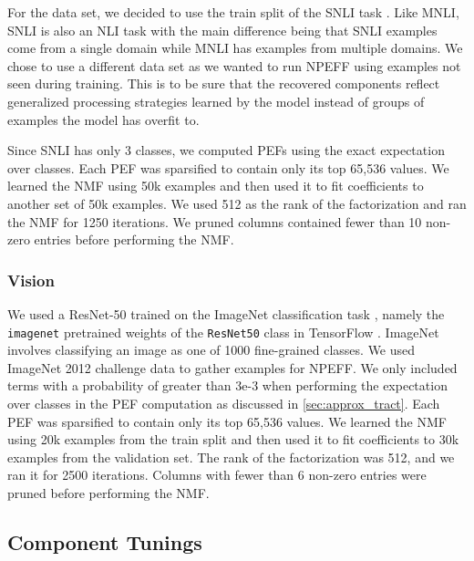 \documentclass[dvipsnames]{article}
\begin{document}
For the data set, we decided to use the train split of the SNLI task \citep{bowman2015large}.
Like MNLI, SNLI is also an NLI task with the main difference being that SNLI examples come from a single domain while MNLI has examples from multiple domains.
We chose to use a different data set as we wanted to run NPEFF using examples not seen during training.
This is to be sure that the recovered components reflect generalized processing strategies learned by the model instead of groups of examples the model has overfit to.

Since SNLI has only 3 classes, we computed PEFs using the exact expectation over classes.
Each PEF was sparsified to contain only its top 65,536 values.
We learned the NMF using 50k examples and then used it to fit coefficients to another set of 50k examples.
We used 512 as the rank of the factorization and ran the NMF for 1250 iterations.
We pruned columns contained fewer than 10 non-zero entries before performing the NMF.

\subsubsection{Vision}
We used a ResNet-50 \citep{he2016deep} trained on the ImageNet classification task \citep{imagenet}, namely the \texttt{imagenet} pretrained weights of the \texttt{ResNet50} class in TensorFlow \citep{abadi2016tensorflow}.
ImageNet involves classifying an image as one of 1000 fine-grained classes.
We used ImageNet 2012 challenge data to gather examples for NPEFF.
We only included terms with a probability of greater than 3e-3 when performing the expectation over classes in the PEF computation as discussed in \cref{sec:approx_tract}.
Each PEF was sparsified to contain only its top 65,536 values.
We learned the NMF using 20k examples from the train split and then used it to fit coefficients to 30k examples from the validation set.
The rank of the factorization was 512, and we ran it for 2500 iterations.
Columns with fewer than 6 non-zero entries were pruned before performing the NMF.


\subsection{Component Tunings}
\end{document}
